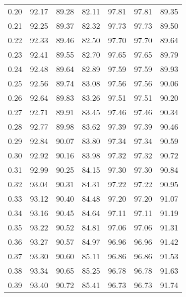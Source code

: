 \begin{tabular}{|c|c|c|c|c|c|c|}
      0.20 &     92.17 &     89.28 &      82.11 &   97.81 &      97.81 &         89.35 \\
      0.21 &     92.25 &     89.37 &      82.32 &   97.73 &      97.73 &         89.50 \\
      0.22 &     92.33 &     89.46 &      82.50 &   97.70 &      97.70 &         89.64 \\
      0.23 &     92.41 &     89.55 &      82.70 &   97.65 &      97.65 &         89.79 \\
      0.24 &     92.48 &     89.64 &      82.89 &   97.59 &      97.59 &         89.93 \\
      0.25 &     92.56 &     89.74 &      83.08 &   97.56 &      97.56 &         90.06 \\
      0.26 &     92.64 &     89.83 &      83.26 &   97.51 &      97.51 &         90.20 \\
      0.27 &     92.71 &     89.91 &      83.45 &   97.46 &      97.46 &         90.34 \\
      0.28 &     92.77 &     89.98 &      83.62 &   97.39 &      97.39 &         90.46 \\
      0.29 &     92.84 &     90.07 &      83.80 &   97.34 &      97.34 &         90.59 \\
      0.30 &     92.92 &     90.16 &      83.98 &   97.32 &      97.32 &         90.72 \\
      0.31 &     92.99 &     90.25 &      84.15 &   97.30 &      97.30 &         90.84 \\
      0.32 &     93.04 &     90.31 &      84.31 &   97.22 &      97.22 &         90.95 \\
      0.33 &     93.12 &     90.40 &      84.48 &   97.20 &      97.20 &         91.07 \\
      0.34 &     93.16 &     90.45 &      84.64 &   97.11 &      97.11 &         91.19 \\
      0.35 &     93.22 &     90.52 &      84.81 &   97.06 &      97.06 &         91.31 \\
      0.36 &     93.27 &     90.57 &      84.97 &   96.96 &      96.96 &         91.42 \\
      0.37 &     93.30 &     90.60 &      85.11 &   96.86 &      96.86 &         91.53 \\
      0.38 &     93.34 &     90.65 &      85.25 &   96.78 &      96.78 &         91.63 \\
      0.39 &     93.40 &     90.72 &      85.41 &   96.73 &      96.73 &         91.74 \\

\end{tabular}
